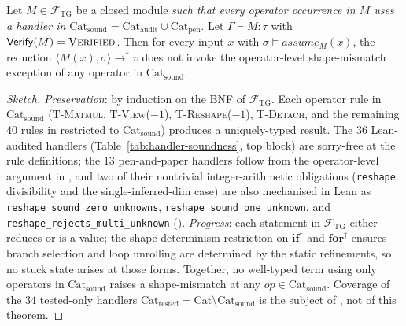 \begin{theorem}
\label{thm:fragment-soundness}
Let $M\in\mathcal{F}_\mathrm{TG}$ be a closed module \emph{such that
every operator occurrence in $M$ uses a handler in
$\mathrm{Cat}_{\mathrm{sound}}=\mathrm{Cat}_{\mathrm{audit}}\cup
\mathrm{Cat}_{\mathrm{pen}}$}. Let $\Gamma\vdash M:\tau$ with
$\mathsf{Verify}(M)=\textsc{Verified}$. Then for every input $x$
with $\sigma\models\mathit{assume}_M(x)$, the reduction
$\langle M(x),\sigma\rangle\to^* v$ does not invoke the
operator-level shape-mismatch exception of any operator in
$\mathrm{Cat}_{\mathrm{sound}}$.
\end{theorem}
\begin{proof}[Sketch]
\emph{Preservation}: by induction on the BNF of $\mathcal{F}_\mathrm{TG}$.
Each operator rule in $\mathrm{Cat}_{\mathrm{sound}}$
(\textsc{T-Matmul}, \textsc{T-View($-1$)}, \textsc{T-Reshape($-1$)},
\textsc{T-Detach}, and the remaining $40$ rules in
 restricted to $\mathrm{Cat}_{\mathrm{sound}}$)
produces a uniquely-typed result. The $36$ Lean-audited handlers
(Table~\ref{tab:handler-soundness}, top block) are sorry-free at
the rule definitions; the $13$ pen-and-paper handlers follow from
the operator-level argument in , and two of
their nontrivial integer-arithmetic obligations
(\texttt{reshape} divisibility and the
single-inferred-dim case) are also mechanised in Lean as
\texttt{reshape\_sound\_zero\_unknowns},
\texttt{reshape\_sound\_one\_unknown}, and
\texttt{reshape\_rejects\_multi\_unknown} ().
\emph{Progress}: each statement in $\mathcal{F}_\mathrm{TG}$ either reduces
or is a value; the shape-determinism restriction on $\textbf{if}^\dagger$ and
$\textbf{for}^\dagger$ ensures branch selection and loop unrolling are
determined by the static refinements, so no stuck state arises at those
forms.
Together, no well-typed term using only operators in
$\mathrm{Cat}_{\mathrm{sound}}$ raises a shape-mismatch at any
$\mathit{op}\in\mathrm{Cat}_{\mathrm{sound}}$. Coverage of the
$34$ tested-only handlers
$\mathrm{Cat}_{\mathrm{tested}}=\mathrm{Cat}\setminus
\mathrm{Cat}_{\mathrm{sound}}$ is the subject of
, not of this theorem.
\end{proof}

